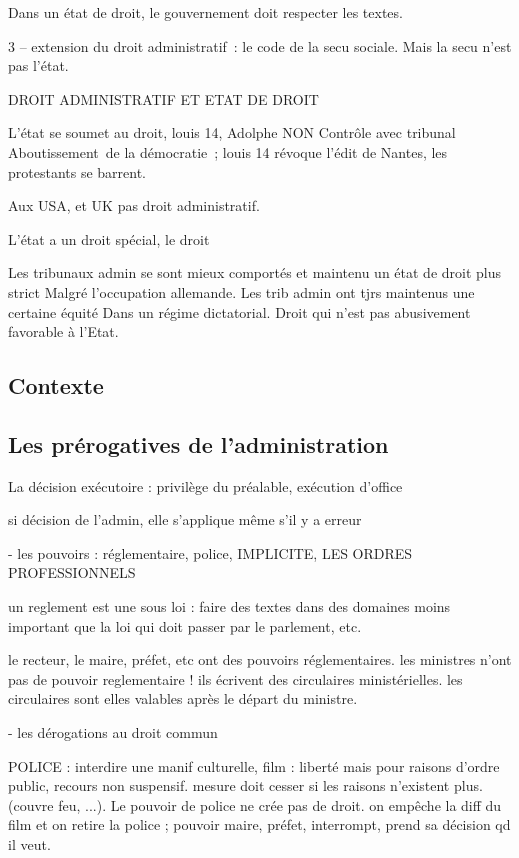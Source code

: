 \documentclass[a4paper,12pt]{article}
\begin{document}
Dans un état de droit, le gouvernement doit respecter les textes.

3 – extension du droit administratif : le code de la secu sociale. Mais la secu n’est pas l’état.

DROIT ADMINISTRATIF ET ETAT DE DROIT


L’état se soumet au droit, louis 14, Adolphe NON
Contrôle avec tribunal
Aboutissement de la démocratie ; louis 14 révoque l’édit de Nantes, les protestants se barrent.

Aux USA, et UK pas droit administratif.

L’état a un droit spécial, le droit 

Les tribunaux admin se sont mieux comportés et maintenu un état de droit plus strict
Malgré l’occupation allemande. Les trib admin ont tjrs maintenus une certaine équité
Dans un régime dictatorial. Droit qui n’est pas abusivement favorable à l’Etat.



\subsection{Contexte}
\subsection{Les prérogatives de l'administration}


La décision exécutoire : privilège du préalable, exécution d'office

si décision de l'admin, elle s'applique même s'il y a erreur




- les pouvoirs : réglementaire, police,  IMPLICITE, LES ORDRES PROFESSIONNELS

un reglement est une sous loi : faire des textes dans des domaines moins important
que la loi qui doit passer par le parlement, etc.


le recteur, le maire, préfet, etc ont des pouvoirs réglementaires.
les ministres n'ont pas de pouvoir reglementaire ! ils écrivent des circulaires ministérielles.
les circulaires sont elles valables après le départ du ministre.


- les dérogations au droit commun

POLICE : interdire une manif culturelle, film : liberté mais pour raisons d'ordre public, recours non suspensif.
mesure doit cesser si les raisons n'existent plus.  (couvre feu, ...). Le pouvoir de police ne crée pas de droit.
on empêche la diff du film et on retire la police ; pouvoir maire, préfet, interrompt, prend sa décision qd il veut.
\end{document}
